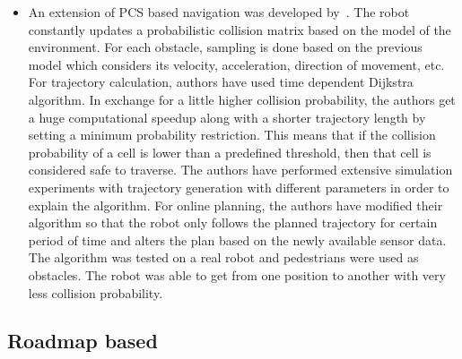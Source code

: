 \begin{itemize}
\item An extension of PCS based navigation was developed by~\cite{hernandez2015application}. The robot constantly updates a probabilistic collision matrix based on the model of the environment. For each obstacle, sampling is done based on the previous model which considers its velocity, acceleration, direction of movement, etc. For trajectory calculation, authors have used time dependent Dijkstra algorithm. In exchange for a little higher collision probability, the authors get a huge computational speedup along with a shorter trajectory length by setting a minimum probability restriction. This means that if the collision probability of a cell is lower than a predefined threshold, then that cell is considered safe to traverse. The authors have performed extensive simulation experiments with trajectory generation with different parameters in order to explain the algorithm. For online planning, the authors have modified their algorithm so that the robot only follows the planned trajectory for certain period of time and alters the plan based on the newly available sensor data. The algorithm was tested on a real robot and pedestrians were used as obstacles. The robot was able to get from one position to another with very less collision probability.
\end{itemize}

\subsection{Roadmap based}%
\label{sub:roadmap_based}

